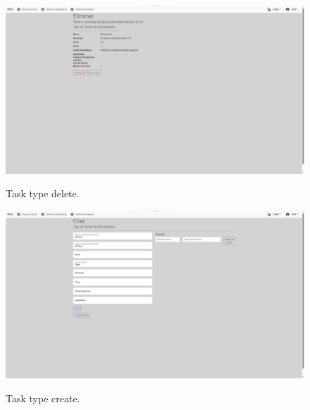  
\begin{figure}[h]
  \caption{Task type delete.}
  \centering
  \includegraphics[width=\textwidth]{figs/Implementation/dealershipAdmin/taskDelete}
  \label{fig:figure2}
\end{figure}

\begin{figure}[h]
  \caption{Task type create.}
  \centering
  \includegraphics[width=\textwidth]{figs/Implementation/dealershipAdmin/taskCreate}
  \label{fig:figure2}
\end{figure}



